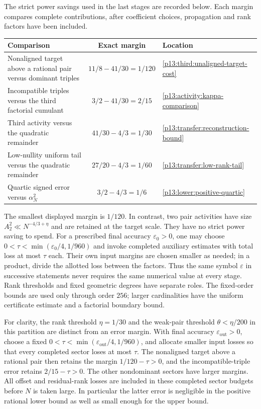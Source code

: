 The strict power savings used in the last stages are recorded below.
Each margin compares complete contributions, after coefficient choices,
propagation and rank factors have been included.
\begin{center}
\small
\begin{tabularx}{\textwidth}{@{}Xcl@{}}
\toprule
Comparison & Exact margin & Location\\
\midrule
Nonaligned target above a rational pair versus dominant triples
& $11/8-41/30=1/120$
& \eqref{p13:third:unaligned-target-cost}\\[4pt]
Incompatible triples versus the third factorial cumulant
& $3/2-41/30=2/15$
& \eqref{p13:activity:kappa-comparison}\\[4pt]
Third activity versus the quadratic remainder
& $41/30-4/3=1/30$
& \eqref{p13:transfer:reconstruction-bound}\\[4pt]
Low-nullity uniform tail versus the quadratic remainder
& $27/20-4/3=1/60$
& \eqref{p13:transfer:low-rank-tail}\\[4pt]
Quartic signed error versus $\alpha_N^2$
& $3/2-4/3=1/6$
& \eqref{p13:lower:positive-quartic}\\
\bottomrule
\end{tabularx}
\end{center}
The smallest displayed margin is $1/120$. In contrast, two pair
activities have size $A_2^2\ll N^{-4/3+\eta}$ and are retained at
the target scale. They have no strict power saving to spend.
For a prescribed final accuracy $\varepsilon_0>0$, one may choose
$0<\tau<\min(\varepsilon_0/4,1/960)$ and invoke completed auxiliary
estimates with total loss at most $\tau$ each. Their own input margins
are chosen smaller as needed; in a product, divide the allotted loss
between the factors. Thus the same symbol $\varepsilon$ in successive
statements never requires the same numerical value at every stage.
Rank thresholds and fixed geometric degrees have separate roles.
The fixed-order bounds are used only through order $256$; larger
cardinalities have the uniform certificate estimate and a factorial
boundary bound.

For clarity, the rank threshold $\eta=1/30$ and the weak-pair threshold
$\theta<\eta/200$ in this partition are distinct from an error margin.
With final accuracy $\varepsilon_{\mathrm{out}}>0$, choose a fixed
$0<\tau<\min(\varepsilon_{\mathrm{out}}/4,1/960)$, and allocate
smaller input losses so that every completed sector loses at most
$\tau$. The nonaligned target above a rational pair then retains the
margin $1/120-\tau>0$, and the incompatible-triple error retains
$2/15-\tau>0$. The other nondominant sectors have larger margins.
All offset and residual-rank losses are included in these completed
sector budgets before $N$ is taken large. In particular the latter
error is negligible in the positive rational lower bound as well as
small enough for the upper bound.

